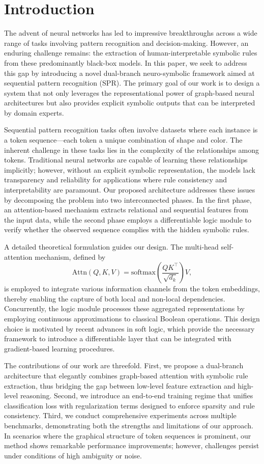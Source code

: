 \documentclass[11pt]{article}
\begin{document}
\section{Introduction}
The advent of neural networks has led to impressive breakthroughs across a wide range of tasks involving pattern recognition and decision-making. However, an enduring challenge remains: the extraction of human-interpretable symbolic rules from these predominantly black-box models. In this paper, we seek to address this gap by introducing a novel dual-branch neuro-symbolic framework aimed at sequential pattern recognition (SPR). The primary goal of our work is to design a system that not only leverages the representational power of graph-based neural architectures but also provides explicit symbolic outputs that can be interpreted by domain experts.

Sequential pattern recognition tasks often involve datasets where each instance is a token sequence—each token a unique combination of shape and color. The inherent challenge in these tasks lies in the complexity of the relationships among tokens. Traditional neural networks are capable of learning these relationships implicitly; however, without an explicit symbolic representation, the models lack transparency and reliability for applications where rule consistency and interpretability are paramount. Our proposed architecture addresses these issues by decomposing the problem into two interconnected phases. In the first phase, an attention-based mechanism extracts relational and sequential features from the input data, while the second phase employs a differentiable logic module to verify whether the observed sequence complies with the hidden symbolic rules.

A detailed theoretical formulation guides our design. The multi-head self-attention mechanism, defined by
\[
\mathrm{Attn}(Q,K,V) = \mathrm{softmax}\left(\frac{QK^\top}{\sqrt{d_k}}\right)V,
\]
is employed to integrate various information channels from the token embeddings, thereby enabling the capture of both local and non-local dependencies. Concurrently, the logic module processes these aggregated representations by employing continuous approximations to classical Boolean operations. This design choice is motivated by recent advances in soft logic, which provide the necessary framework to introduce a differentiable layer that can be integrated with gradient-based learning procedures.

The contributions of our work are threefold. First, we propose a dual-branch architecture that elegantly combines graph-based attention with symbolic rule extraction, thus bridging the gap between low-level feature extraction and high-level reasoning. Second, we introduce an end-to-end training regime that unifies classification loss with regularization terms designed to enforce sparsity and rule consistency. Third, we conduct comprehensive experiments across multiple benchmarks, demonstrating both the strengths and limitations of our approach. In scenarios where the graphical structure of token sequences is prominent, our method shows remarkable performance improvements; however, challenges persist under conditions of high ambiguity or noise.
\end{document}
